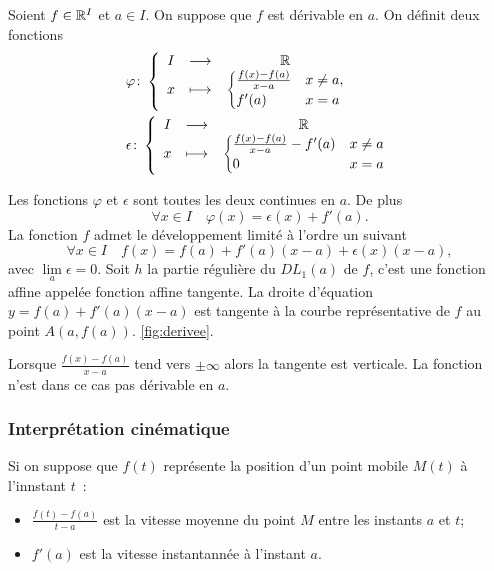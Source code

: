 Soient \(f \in \mathbb{R}^I\) et \(a \in I\). On suppose que \(f\) est dérivable en \(a\). On définit deux fonctions
\begin{align}
  &\varphi\colon \left\{\begin{array}{ccc} I & \longrightarrow &\mathbb{R}\\ x & \longmapsto & \begin{cases}\frac{f(x)-f(a)}{x-a} & x \neq a, \\ f'(a) & x=a\end{cases} \end{array} \right. \\ 
  &\epsilon\colon \left\{\begin{array}{ccc} I & \longrightarrow &\mathbb{R}\\ x & \longmapsto & \begin{cases}\frac{f(x)-f(a)}{x-a} -f'(a)& x \neq a \\ 0 & x=a\end{cases} \end{array} \right.
\end{align}
%
\begin{prop}
  Les fonctions \(\varphi\) et \(\epsilon\) sont toutes les deux continues en \(a\). De plus
  \begin{equation}
    \forall x \in I \quad \varphi(x) = \epsilon(x) +f'(a).
  \end{equation}
  La fonction \(f\) admet le développement limité à l'ordre un suivant
  \begin{equation}
    \forall x \in I \quad f(x) = f(a) + f'(a)(x-a) + \epsilon(x)(x-a),
  \end{equation}
  avec \(\lim\limits_{a} \epsilon=0\). Soit \(h\) la partie régulière du \(DL_1(a)\) de \(f\), c'est une fonction affine appelée fonction affine tangente. La droite d'équation \(y=f(a)+f'(a)(x-a)\) est tangente à la courbe représentative de \(f\) au point \(A(a,f(a))\).
\ref{fig:derivee}. 
\end{prop}
%
Lorsque \(\frac{f(x)-f(a)}{x-a}\) tend vers \(\pm\infty\) alors la tangente est verticale. La fonction n'est dans ce cas pas dérivable en \(a\).

\subsubsection{Interprétation cinématique}
Si on suppose que \(f(t)\) représente la position d'un point mobile \(M(t)\) à l'innstant \(t\)~:
\begin{itemize}
\item \(\frac{f(t)-f(a)}{t-a}\) est la vitesse moyenne du point \(M\) entre les instants \(a\) et \(t\);
\item \(f'(a)\) est la vitesse instantannée à l'instant \(a\).
\end{itemize}

